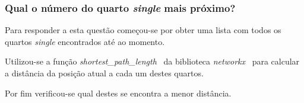 \subsubsection{Qual o número do quarto \textit{single} mais próximo?}
\label{chap2:subsec:q5}

Para responder a esta questão começou-se por obter uma lista com todos os quartos \textit{single} encontrados até ao momento.

Utilizou-se a função \textit{shortest\_path\_length}~\cite{shortest_path_lenght} da biblioteca \textit{networkx}~\cite{networkx} para calcular a distância da posição atual a cada um destes quartos.

Por fim verificou-se qual destes se encontra a menor distância.

